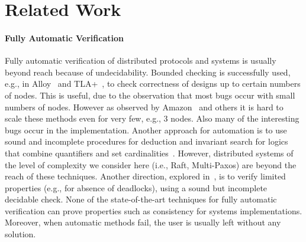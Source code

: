 \section{Related Work}
\label{sec:related}

\paragraph{Fully Automatic Verification}
\begin{sloppypar}
Fully automatic
verification of distributed protocols and systems is usually beyond reach because of
undecidability. Bounded checking is successfully used, e.g., in
Alloy~\cite{alloy} and TLA+~\cite{tla}, to check correctness of designs
up to certain numbers of nodes. This is useful, due to the
observation that most bugs occur with small numbers of nodes.  However
as observed by Amazon~\cite{amazon} and others it is hard to scale
these methods even for very few, e.g., $3$ nodes. Also many of the
interesting bugs occur in the implementation.
Another approach for automation is to use sound and incomplete procedures for deduction and invariant search for logics that combine quantifiers and set cardinalities~\cite{gleissenthall_cardinalities_2016,sally}.
However, distributed systems of the level of complexity we consider here (i.e., Raft, Multi-Paxos) are beyond the reach of these techniques.
Another direction, explored in~\cite{DBLP:journals/pacmpl/BakstGKJ17}, is to verify limited properties (e.g., for absence of deadlocks), using a sound but incomplete decidable check.
None of the state-of-the-art techniques for fully automatic verification can prove properties such as consistency for systems implementations.
Moreover, when automatic methods fail, the user is usually left without any solution.
\end{sloppypar}

